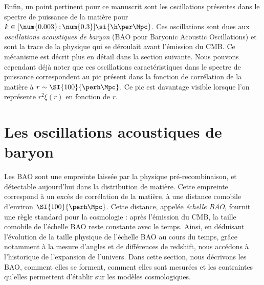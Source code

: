 Enfin, un point pertinent pour ce manuscrit sont les oscillations présentes dans le spectre de puissance de la matière pour $k \in [\num{0.003} \,; \num{0.3}] \si{\h\per\Mpc}$. Ces oscillations sont dues aux \emph{oscillations acoustiques de baryon} (BAO pour Baryonic Acoustic Oscillations) et sont la trace de la physique qui se déroulait avant l'émission du CMB. Ce mécanisme est décrit plus en détail dans la section suivante. Nous pouvons cependant déjà noter que ces oscillations caractéristiques dans le spectre de puissance correspondent au pic présent dans la fonction de corrélation de la matière à $r \sim \SI{100}{\perh\Mpc}$. Ce pic est davantage visible lorsque l'on représente $r^2\xi(r)$ en fonction de $r$.

\section{Les oscillations acoustiques de baryon}
\label{sec:bao}
Les BAO sont une empreinte laissée par la physique pré-recombinaison, et détectable aujourd'hui dans la distribution de matière. Cette empreinte correspond à un excès de corrélation de la matière, à une distance comobile d'environ $\SI{100}{\perh\Mpc}$. Cette distance, appelée \emph{échelle BAO}, fournit une règle standard pour la cosmologie : après l'émission du CMB, la taille comobile de l'échelle BAO reste constante avec le temps.
Ainsi, en déduisant l'évolution de la taille physique de l'échelle BAO au cours du temps, grâce notamment à la mesure d'angles et de différences de redshift, nous accédons à l'historique de l'expansion de l'univers.
Dans cette section, nous décrivons les BAO, comment elles se forment, comment elles sont mesurées et les contraintes qu'elles permettent d'établir sur les modèles cosmologiques.

